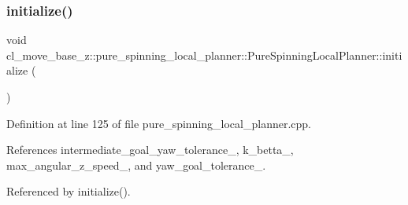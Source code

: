 \subsubsection{\texorpdfstring{initialize()}{initialize()}\hspace{0.1cm}{\footnotesize\ttfamily [3/3]}}
{\footnotesize\ttfamily void cl\+\_\+move\+\_\+base\+\_\+z\+::pure\+\_\+spinning\+\_\+local\+\_\+planner\+::\+Pure\+Spinning\+Local\+Planner\+::initialize (\begin{DoxyParamCaption}{ }\end{DoxyParamCaption})}



Definition at line 125 of file pure\+\_\+spinning\+\_\+local\+\_\+planner.\+cpp.



References intermediate\+\_\+goal\+\_\+yaw\+\_\+tolerance\+\_\+, k\+\_\+betta\+\_\+, max\+\_\+angular\+\_\+z\+\_\+speed\+\_\+, and yaw\+\_\+goal\+\_\+tolerance\+\_\+.



Referenced by initialize().



